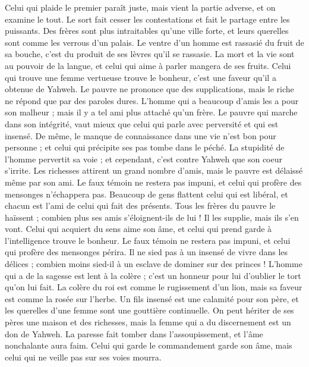 \begin{multicols}{2}
Celui qui plaide le premier paraît juste, mais vient la partie adverse, et on examine le tout.
Le sort fait cesser les contestations et fait le partage entre les puissants.
Des frères sont plus intraitables qu’une ville forte, et leurs querelles sont comme les verrous d'un palais.
Le ventre d’un homme est rassasié du fruit de sa bouche, c’est du produit de ses lèvres qu’il se rassasie.
La mort et la vie sont au pouvoir de la langue, et celui qui aime à parler mangera de ses fruits.
Celui qui trouve une femme vertueuse trouve le bonheur, c’est une faveur qu’il a obtenue de Yahweh.
Le pauvre ne prononce que des supplications, mais le riche ne répond que par des paroles dures.
L’homme qui a beaucoup d’amis les a pour son malheur ; mais il y a tel ami plus attaché qu'un frère.
\VerseOne{}Le pauvre qui marche dans son intégrité, vaut mieux que celui qui parle avec perversité et qui est insensé.
De même, le manque de connaissance dans une vie n'est bon pour personne ; et celui qui précipite ses pas tombe dans le péché.
La stupidité de l'homme pervertit sa voie ; et cependant, c’est contre Yahweh que son coeur s’irrite.
Les richesses attirent un grand nombre d'amis, mais le pauvre est délaissé même par son ami.
Le faux témoin ne restera pas impuni, et celui qui profère des mensonges n'échappera pas.
Beaucoup de gens flattent celui qui est libéral, et chacun est l’ami de celui qui fait des présents.
Tous les frères du pauvre le haïssent ; combien plus ses amis s’éloignent-ils de lui ! Il les supplie, mais ils s’en vont.
Celui qui acquiert du sens aime son âme, et celui qui prend garde à l'intelligence trouve le bonheur.
Le faux témoin ne restera pas impuni, et celui qui profère des mensonges périra.
Il ne sied pas à un insensé de vivre dans les délices ; combien moins sied-il à un esclave de dominer sur des princes !
L'homme qui a de la sagesse est lent à la colère ; c'est un honneur pour lui d’oublier le tort qu'on lui fait.
La colère du roi est comme le rugissement d'un lion, mais sa faveur est comme la rosée sur l'herbe.
Un fils insensé est une calamité pour son père, et les querelles d’une femme sont une gouttière continuelle.
On peut hériter de ses pères une maison et des richesses, mais la femme qui a du discernement est un don de Yahweh.
La paresse fait tomber dans l’assoupissement, et l'âme nonchalante aura faim.
Celui qui garde le commandement garde son âme, mais celui qui ne veille pas sur ses voies mourra.

\end{multicols}
